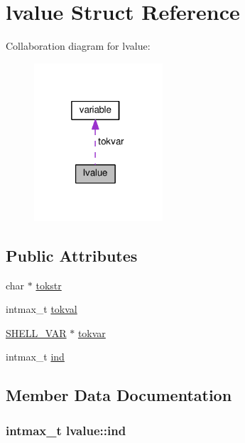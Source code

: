 \hypertarget{structlvalue}{}\section{lvalue Struct Reference}
\label{structlvalue}


Collaboration diagram for lvalue\+:
\nopagebreak
\begin{figure}[H]
\begin{center}
\leavevmode
\includegraphics[width=136pt]{structlvalue__coll__graph}
\end{center}
\end{figure}
\subsection*{Public Attributes}
\begin{DoxyCompactItemize}
\item 
char $\ast$ \hyperlink{structlvalue_a69733836b6e89608c3b7f52575f168b6}{tokstr}
\item 
intmax\+\_\+t \hyperlink{structlvalue_a586486707a36587077d5c14c477e8a2a}{tokval}
\item 
\hyperlink{variables_8h_aba7363ba59b9546110e58106ad60cb50}{S\+H\+E\+L\+L\+\_\+\+V\+AR} $\ast$ \hyperlink{structlvalue_a6875190861863191326371f28d09a933}{tokvar}
\item 
intmax\+\_\+t \hyperlink{structlvalue_adc2354fd6009088922174d0b040a4e77}{ind}
\end{DoxyCompactItemize}


\subsection{Member Data Documentation}
\subsubsection[{\texorpdfstring{ind}{ind}}]{\setlength{\rightskip}{0pt plus 5cm}intmax\+\_\+t lvalue\+::ind}\hypertarget{structlvalue_adc2354fd6009088922174d0b040a4e77}{}\label{structlvalue_adc2354fd6009088922174d0b040a4e77}
